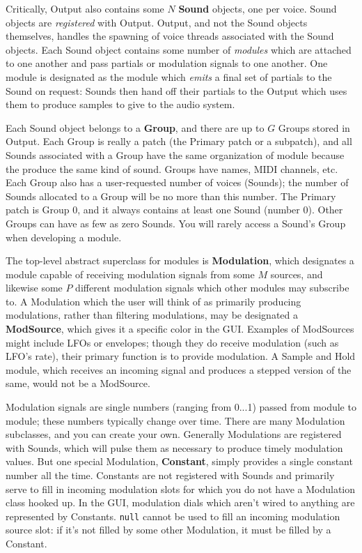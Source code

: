 \documentclass{article}
\begin{document}
Critically, Output also contains some \(N\) {\bf Sound} objects, one per voice.  Sound objects are {\it registered} with Output.  Output, and not the Sound objects themselves, handles the spawning of voice threads associated with the Sound objects.  Each Sound object contains some number of {\it modules} which are attached to one another and pass partials or modulation signals to one another.  One module is designated as the module which {\it emits} a final set of partials to the Sound on request: Sounds then hand off their partials to the Output which uses them to produce samples to give to the audio system. 

Each Sound object belongs to a {\bf Group}, and there are up to \(G\) Groups stored in Output.   Each Group is really a patch (the Primary patch or a subpatch), and all Sounds associated with a Group have the same organization of module because the produce the same kind of sound.  Groups have names, MIDI channels, etc.  Each Group also has a user-requested number of voices (Sounds); the number of Sounds allocated to a Group will be no more than this number.  The Primary patch is Group 0, and it always contains at least one Sound (number 0).  Other Groups can have as few as zero Sounds.  You will rarely access a Sound's Group when developing a module.

The top-level abstract superclass for modules is {\bf Modulation}, which designates a module capable of receiving modulation signals from some \(M\) sources, and likewise some \(P\) different modulation signals which other modules may subscribe to.  A Modulation which the user will think of as primarily producing modulations, rather than filtering modulations, may be designated a {\bf ModSource}, which gives it a specific color in the GUI. Examples of ModSources might include LFOs or envelopes; though they do receive modulation (such as LFO's rate), their primary function is to provide modulation.  A Sample and Hold module, which receives an incoming signal and produces a stepped version of the same, would not be a ModSource.
 
Modulation signals are single numbers (ranging from 0...1) passed from module to module; these numbers typically change over time.  There are many Modulation subclasses, and you can create your own.  Generally Modulations are registered with Sounds, which will pulse them as necessary to produce timely modulation values.  But one special Modulation, {\bf Constant}, simply provides a single constant number all the time.  Constants are not registered with Sounds and primarily serve to fill in incoming modulation slots for which you do not have a Modulation class hooked up.  In the GUI, modulation dials which aren't wired to anything are represented by Constants.  {\tt null} cannot be used to fill an incoming modulation source slot: if it's not filled by some other Modulation, it must be filled by a Constant.
\end{document}
